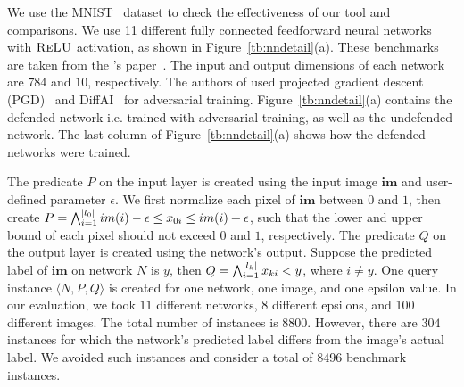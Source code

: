 We use the MNIST~\cite{deng2012mnist} dataset to check the effectiveness of our tool and comparisons. We use 11 different fully connected feedforward neural networks with $\textsc{ReLU}${} activation, as shown in Figure~\ref{tb:nndetail}(a).
These benchmarks are taken from the \deeppoly{}'s paper~\cite{singh2019abstract}.  The input and output dimensions of each network are $784$ and $10$, respectively.  The authors of \deeppoly{} used projected gradient descent (PGD)~\cite{dong2018boosting}
and DiffAI~\cite{mirman2018differentiable} for adversarial training. Figure~\ref{tb:nndetail}(a) contains the defended network i.e.
trained with adversarial training, as well as the undefended network. The last column of Figure~\ref{tb:nndetail}(a) shows how the defended networks were trained.  

The predicate $P$ on the input layer is created using the input image $\boldsymbol{im}$ and user-defined 
parameter $\epsilon$.  We first normalize each pixel of $\boldsymbol{im}$ between $0$ and $1$, 
then create  $P = \bigwedge_{i=1}^{|l_0|} im(i)-\epsilon \leq x_{0i}\leq im(i)+\epsilon$, such that the lower and upper 
bound of each pixel should not exceed $0$ and $1$, respectively. 
The predicate $Q$ on the output layer is created using the network's output.     
Suppose the predicted label of $\boldsymbol{im}$ on network $N$ is $y$, then $Q = \bigwedge_{i=1}^{|l_k|} x_{ki} < y$, 
where $i \neq y$.  One query instance $\langle N,P,Q \rangle$ is created for one network, one image, and one epsilon 
value.  In our evaluation, we took $11$ different networks, 8 different epsilons, and 100 different images. 
The total number of instances is $8800$. However, there are $304$ instances for which the network's predicted label differs from the image's actual label. 
We avoided such instances and consider a total of $8496$ benchmark instances.    



